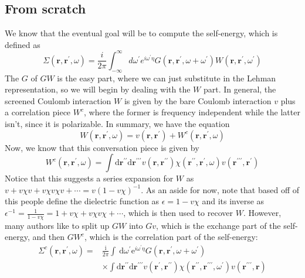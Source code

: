 \documentclass[12pt]{article}
\begin{document}
\subsection{From scratch}
We know that the eventual goal will be to compute the self-energy, which is defined as
\begin{equation}
\Sigma\left(\mathbf{r}, \mathbf{r}^{\prime}, \omega\right)=\frac{i}{2 \pi} \int_{-\infty}^{\infty} d \omega^{\prime} e^{i \omega^{\prime} \eta} G\left(\mathbf{r}, \mathbf{r}^{\prime}, \omega+\omega^{\prime}\right) W\left(\mathbf{r}, \mathbf{r}^{\prime}, \omega^{\prime}\right)
\end{equation}
The $G$ of $GW$ is the easy part, where we can just substitute in the Lehman representation, so we will begin by dealing with the $W$ part. In general, the screened Coulomb interaction $W$ is given by the bare Coulomb interaction $v$ plus a correlation piece $W^c$, where the former is frequency independent while the latter isn't, since it is polarizable. In summary, we have the equation
\begin{equation}
    W(\mathbf{r}, \mathbf{r}^{\prime}, \omega) = v(\mathbf{r}, \mathbf{r}^{\prime}) + W^c(\mathbf{r}, \mathbf{r}^{\prime}, \omega)
\end{equation}
Now, we know that this conversation piece is given by
\begin{equation}
    W^c(\mathbf{r}, \mathbf{r}^{\prime}, \omega) =\int \mathrm{d} \mathbf{r}^{\prime \prime} \mathrm{d} \mathbf{r}^{\prime \prime \prime} v\left(\mathbf{r}, \mathbf{r}^{\prime \prime}\right) \chi\left(\mathbf{r}^{\prime \prime}, \mathbf{r}^{\prime}, \omega\right) v\left(\mathbf{r}^{\prime \prime \prime}, \mathbf{r}^{\prime}\right)
\end{equation}
Notice that this suggests a series expansion for $W$ as $v+v\chi v +v\chi v\chi v + \cdots = v(1-v\chi )^{-1}$. As an aside for now, note that based off of this people define the dielectric function as $\epsilon = 1-v\chi$ and its inverse as $\epsilon^{-1}=\frac{1}{1-v\chi} = 1 + v\chi + v\chi v\chi + \cdots$, which is then used to recover $W$. However, many authors like to split up $GW$ into $Gv$, which is the exchange part of the self-energy, and then $GW^c$, which is the correlation part of the self-energy:
\begin{equation}
\begin{aligned}
\Sigma^c\left(\mathbf{r}, \mathbf{r}^{\prime}, \omega\right)= & \frac{\mathrm{i}}{2 \pi} \int \mathrm{~d} \omega^{\prime} \mathrm{e}^{i \omega^{\prime}\eta} G\left(\mathbf{r}, \mathbf{r}^{\prime}, \omega+\omega^{\prime}\right) \\
& \times \int \mathrm{d} \mathbf{r}^{\prime \prime} \mathrm{d} \mathbf{r}^{\prime \prime \prime} v\left(\mathbf{r}^{\prime}, \mathbf{r}^{\prime \prime}\right) \chi\left(\mathbf{r}^{\prime \prime}, \mathbf{r}^{\prime \prime \prime}, \omega^{\prime}\right) v\left(\mathbf{r}^{\prime \prime \prime}, \mathbf{r}\right)
\end{aligned}
\end{equation}
\end{document}
